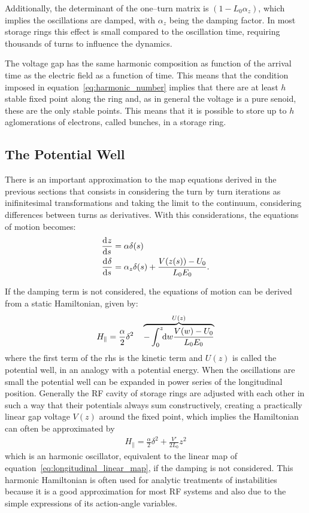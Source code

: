 	Additionally, the determinant of the one--turn matrix is $(1-L_0\alpha_z)$, which implies the oscillations are damped, with $\alpha_z$ being the damping factor. In most storage rings this effect is small compared to the oscillation time, requiring thousands of turns to influence the dynamics.

	The voltage gap has the same harmonic composition as function of the arrival time as the electric field as a function of time. This means that the condition imposed in equation~\eqref{eq:harmonic_number} implies that there are at least $h$ stable fixed point along the ring and, as in general the voltage is a pure senoid, these are the only stable points. This means that it is possible to store up to $h$ aglomerations of electrons, called bunches, in a storage ring.

\subsection{The Potential Well}\label{ssec:potential_well}

	There is an important approximation to the map equations derived in the previous sections that consists in considering the turn by turn iterations as inifinitesimal transformations and taking the limit to the continuum, considering differences between turns as derivatives. With this considerations, the equations of motion becomes:
	\begin{align}
		\dertot{z}{s} &= \alpha \delta(s) \\\nonumber
		\dertot{\delta}{s} &= \alpha_z\delta(s) + \frac{V(z(s))-U_0}{L_0E_0}.
	\end{align}

    If the damping term is not considered, the equations of motion can be derived from a static Hamiltonian, given by:
	\begin{align}\label{eq:longitudinal_hamiltonian}
		H_\parallel = \frac\alpha2\delta^2 \quad \overbrace{-
                            \defint{w}{\frac{V(w)-U_0}{L_0E_0}}{0}{z}
                        }^{U(z)}
	\end{align}
	where the first term of the \gls{rhs} is the kinetic term and $U(z)$ is called the potential well, in an analogy with a potential energy. When the oscillations are small the potential well can be expanded in power series of the longitudinal position. Generally the RF cavity of storage rings are adjusted with each other in such a way that their potentials always sum constructively, creating a practically linear gap voltage $V(z)$ around the fixed point, which implies the Hamiltonian can often be approximated by
    \begin{align}\label{eq:quadractic_potential_well}
        H_\parallel = \frac\alpha2\delta^2 + \frac{V'}{2L_0}z^2
    \end{align}
    which is an harmonic oscillator, equivalent to the linear map of equation~\eqref{eq:longitudinal_linear_map}, if the damping is not considered. This harmonic Hamiltonian is often used for analytic treatments of instabilities because it is a good approximation for most RF systems and also due to the simple expressions of its action-angle variables.

